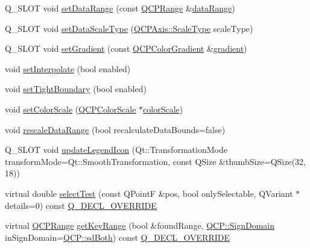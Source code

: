 \begin{DoxyCompactItemize}
Q\+\_\+\+S\+L\+OT void \mbox{\hyperlink{class_q_c_p_color_map_a980b42837821159786a85b4b7dcb8774}{set\+Data\+Range}} (const \mbox{\hyperlink{class_q_c_p_range}{Q\+C\+P\+Range}} \&\mbox{\hyperlink{class_q_c_p_color_map_ae478f0a5a016420d66c70cc33d6cda1d}{data\+Range}})
\item 
Q\+\_\+\+S\+L\+OT void \mbox{\hyperlink{class_q_c_p_color_map_a9d20aa08e3c1f20f22908c45b9c06511}{set\+Data\+Scale\+Type}} (\mbox{\hyperlink{class_q_c_p_axis_a36d8e8658dbaa179bf2aeb973db2d6f0}{Q\+C\+P\+Axis\+::\+Scale\+Type}} scale\+Type)
\item 
Q\+\_\+\+S\+L\+OT void \mbox{\hyperlink{class_q_c_p_color_map_a7313c78360471cead3576341a2c50377}{set\+Gradient}} (const \mbox{\hyperlink{class_q_c_p_color_gradient}{Q\+C\+P\+Color\+Gradient}} \&\mbox{\hyperlink{class_q_c_p_color_map_acc4bb87c903607b96c08d2bc34bc24cd}{gradient}})
\item 
void \mbox{\hyperlink{class_q_c_p_color_map_a484eaa8a5065cfc386b15375bf98b964}{set\+Interpolate}} (bool enabled)
\item 
void \mbox{\hyperlink{class_q_c_p_color_map_ad03221cc285e5f562a0b13d684b5576d}{set\+Tight\+Boundary}} (bool enabled)
\item 
void \mbox{\hyperlink{class_q_c_p_color_map_aa828921db364fe3c6af4619580ab85fd}{set\+Color\+Scale}} (\mbox{\hyperlink{class_q_c_p_color_scale}{Q\+C\+P\+Color\+Scale}} $\ast$\mbox{\hyperlink{class_q_c_p_color_map_a9d37d08c467ac645b86fc71a3b151208}{color\+Scale}})
\item 
void \mbox{\hyperlink{class_q_c_p_color_map_a856608fa3dd1cc290bcd5f29a5575774}{rescale\+Data\+Range}} (bool recalculate\+Data\+Bounds=false)
\item 
Q\+\_\+\+S\+L\+OT void \mbox{\hyperlink{class_q_c_p_color_map_a5d8158b62d55fcfeaabcb68ce0083e87}{update\+Legend\+Icon}} (Qt\+::\+Transformation\+Mode transform\+Mode=Qt\+::\+Smooth\+Transformation, const Q\+Size \&thumb\+Size=Q\+Size(32, 18))
\item 
virtual double \mbox{\hyperlink{class_q_c_p_color_map_afb4b843596addf58096082827a9e3450}{select\+Test}} (const Q\+PointF \&pos, bool only\+Selectable, Q\+Variant $\ast$details=0) const \mbox{\hyperlink{qcustomplot_8h_a42cc5eaeb25b85f8b52d2a4b94c56f55}{Q\+\_\+\+D\+E\+C\+L\+\_\+\+O\+V\+E\+R\+R\+I\+DE}}
\item 
virtual \mbox{\hyperlink{class_q_c_p_range}{Q\+C\+P\+Range}} \mbox{\hyperlink{class_q_c_p_color_map_a985861974560f950af6cb7fae8c46267}{get\+Key\+Range}} (bool \&found\+Range, \mbox{\hyperlink{namespace_q_c_p_afd50e7cf431af385614987d8553ff8a9}{Q\+C\+P\+::\+Sign\+Domain}} in\+Sign\+Domain=\mbox{\hyperlink{namespace_q_c_p_afd50e7cf431af385614987d8553ff8a9aa38352ef02d51ddfa4399d9551566e24}{Q\+C\+P\+::sd\+Both}}) const \mbox{\hyperlink{qcustomplot_8h_a42cc5eaeb25b85f8b52d2a4b94c56f55}{Q\+\_\+\+D\+E\+C\+L\+\_\+\+O\+V\+E\+R\+R\+I\+DE}}

\end{DoxyCompactItemize}
